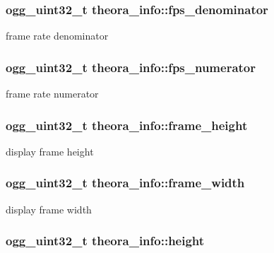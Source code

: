 \subsubsection[{fps\-\_\-denominator}]{\setlength{\rightskip}{0pt plus 5cm}ogg\-\_\-uint32\-\_\-t {\bf theora\-\_\-info\-::fps\-\_\-denominator}}\label{structtheora__info_a9aa7e826e0323a4ae8cd8646a6cfbfea}


frame rate denominator 

\subsubsection[{fps\-\_\-numerator}]{\setlength{\rightskip}{0pt plus 5cm}ogg\-\_\-uint32\-\_\-t {\bf theora\-\_\-info\-::fps\-\_\-numerator}}\label{structtheora__info_a3478199aa5ab213816c1819f70085ad7}


frame rate numerator 

\subsubsection[{frame\-\_\-height}]{\setlength{\rightskip}{0pt plus 5cm}ogg\-\_\-uint32\-\_\-t {\bf theora\-\_\-info\-::frame\-\_\-height}}\label{structtheora__info_a287e4c194f1d2e6deb39d59f1748ea48}


display frame height 

\subsubsection[{frame\-\_\-width}]{\setlength{\rightskip}{0pt plus 5cm}ogg\-\_\-uint32\-\_\-t {\bf theora\-\_\-info\-::frame\-\_\-width}}\label{structtheora__info_a8f28f4018a25634d40e4ae861fbbccfa}


display frame width 

\subsubsection[{height}]{\setlength{\rightskip}{0pt plus 5cm}ogg\-\_\-uint32\-\_\-t {\bf theora\-\_\-info\-::height}}\label{structtheora__info_ae6f0274fc4a7f285c422d91abb35f9c6}


